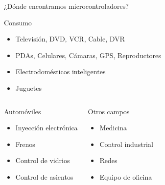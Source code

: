 \documentclass[handout,xcolor=dvipsnames]{beamer}
\begin{document}
\begin{frame}{¿Dónde encontramos microcontroladores?}
  \begin{block}{Consumo}
    \begin{itemize}
    \item Televisión, DVD, VCR, Cable, DVR
    \item PDAs, Celulares, Cámaras, GPS, Reproductores
    \item Electrodomésticos inteligentes
    \item Juguetes
    \end{itemize}
  \end{block}

  \begin{columns}[t]
      \begin{block}{Automóviles}
       \begin{itemize}
        \item Inyección electrónica
	\item Frenos
	\item Control de vidrios
	\item Control de asientos
       \end{itemize}
      \end{block}
      \begin{block}{Otros campos}
       \begin{itemize}
        \item Medicina
	\item Control industrial
	\item Redes
	\item Equipo de oficina
       \end{itemize}
      \end{block}
  \end{columns}

 
\end{frame}
\end{document}
